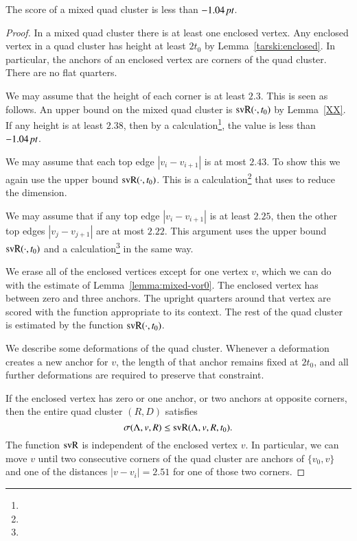 \begin{lemma}
The score of a mixed quad cluster is less than $-1.04\,\hbox{\it pt}$.
\end{lemma}

\begin{proof}
In a mixed quad cluster there is at least one enclosed vertex.
Any enclosed vertex in a quad cluster has height at least $2t_0$
by Lemma~\ref{tarski:enclosed}. In particular, the anchors of an
enclosed vertex are corners of the quad cluster. There are no flat
quarters.

We may assume that the height of each corner is at least $2.3$.
This is seen as follows.  An upper bound on the mixed quad cluster
is ${\operatorname{svR}}(\cdot,t_0)$ by Lemma~\ref{XX}.  If any height is at least
$2.38$, then by a calculation\footnote{},
the value is less than $-1.04\,\hbox{\it pt}$.

We may assume that each top edge $|v_i-v_{i+1}|$ is at most $2.43$.
To show this we again use the upper bound ${\operatorname{svR}}(\cdot,t_0)$.
This is a calculation\footnote{} that uses
to reduce the dimension.

We may assume that if any top edge $|v_i-v_{i+1}|$ is at least $2.25$,
then the other top edges $|v_j-v_{j+1}|$ are at most $2.22$.
This argument uses the upper bound ${\operatorname{svR}}(\cdot,t_0)$ and
a calculation\footnote{} in the same way.


We erase all of the enclosed vertices except for one vertex $v$, which
we can do with the estimate of Lemma~\ref{lemma:mixed-vor0}.
The enclosed vertex has between zero and three anchors.
The upright
quarters around that vertex are scored with the function appropriate
to its context.
The rest of the quad cluster is estimated by the function ${\operatorname{svR}}(\cdot,t_0)$.

We describe some deformations of the quad cluster.  Whenever a deformation
creates a new anchor for $v$, the length of that anchor remains fixed at $2t_0$,
and all further deformations are required to preserve that constraint.


If the enclosed vertex has zero  or one anchor, or two anchors at opposite corners,
then the entire quad
cluster $(R,D)$ satisfies $$\sigma(\Lambda,v,R)\le {\operatorname{svR}}(\Lambda,v,R,t_0).$$
The function ${\operatorname{svR}}$ is independent of the enclosed
vertex $v$.  In particular, we can move $v$ until 
two consecutive  corners of the quad cluster are anchors of $\{v_0,v\}$
and one of the distances $|v-v_i|=2.51$ for one of those two corners.


\end{proof}
